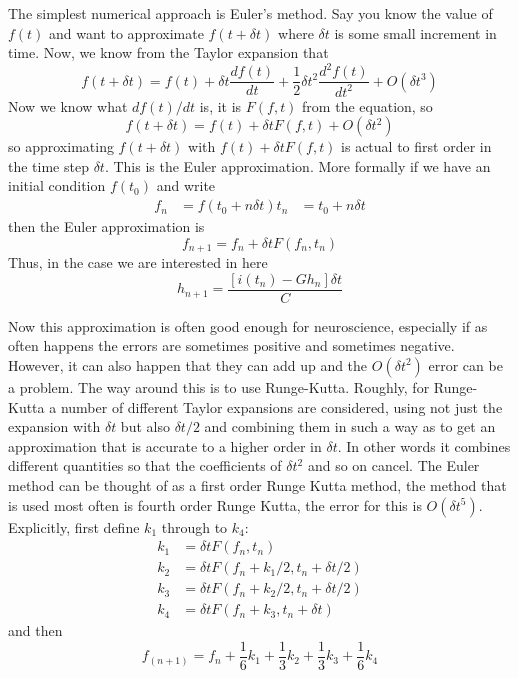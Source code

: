 \documentclass[11pt,a4paper]{scrartcl}
\begin{document}
The simplest numerical approach is Euler's method. Say you know the value of $f(t)$ and want to approximate $f(t+\delta t)$ where $\delta t$ is some small increment in time. Now, we know from the Taylor expansion that
\begin{equation}
f(t+\delta t)=f(t)+\delta t \frac{df(t)}{dt}+\frac{1}{2}\delta t^2 \frac{d^2f(t)}{dt^2}+O(\delta t^3)
\end{equation}
Now we know what $df(t)/dt$ is, it is $F(f,t)$ from the equation, so 
\begin{equation}
f(t+\delta t)=f(t)+\delta t F(f,t) + O(\delta t^2)
\end{equation}
so approximating $f(t+\delta t)$ with $f(t)+\delta t F(f,t)$ is actual
to first order in the time step $\delta t$. This is the Euler
approximation. More formally if we have an initial condition $f(t_0)$ and write
\begin{align}
f_n&=f(t_0+n\delta t)
t_n&=t_0+n\delta t
\end{align}
then the Euler approximation is
\begin{equation}
f_{n+1}=f_n+\delta t F(f_n,t_n)
\end{equation}
Thus, in the case we are interested in here
\begin{equation}
h_{n+1}=\frac{[i(t_n)-Gh_n]\delta t}{C}
\end{equation}

Now this approximation is often good enough for neuroscience,
especially if as often happens the errors are sometimes positive and
sometimes negative. However, it can also happen that they can add up
and the $O(\delta t^2)$ error can be a problem. The way around this is
to use Runge-Kutta. Roughly, for Runge-Kutta a number of different
Taylor expansions are considered, using not just the expansion with
$\delta t$ but also $\delta t /2$ and combining them in such a way as
to get an approximation that is accurate to a higher order in $\delta
t$. In other words it combines different quantities so that the
coefficients of $\delta t^2$ and so on cancel. The Euler method can be
thought of as a first order Runge Kutta method, the method that is
used most often is fourth order Runge Kutta, the error for this is
$O(\delta t^5)$. Explicitly, first define $k_1$ through to $k_4$:
\begin{align}
k_1&=\delta t F(f_n,t_n)\\	
k_2&=\delta t F(f_n+k_1/2,t_n+\delta t/2)\\	
k_3&=\delta t F(f_n+k_2/2,t_n+\delta t/2)\\	
k_4&=\delta t F(f_n+k_3,t_n+\delta t)	
\end{align}
and then
\begin{equation}
f_(n+1)	=f_n+\frac{1}{6}k_1+\frac{1}{3}k_2+\frac{1}{3}k_3+\frac{1}{6}k_4
\end{equation}
\end{document}
